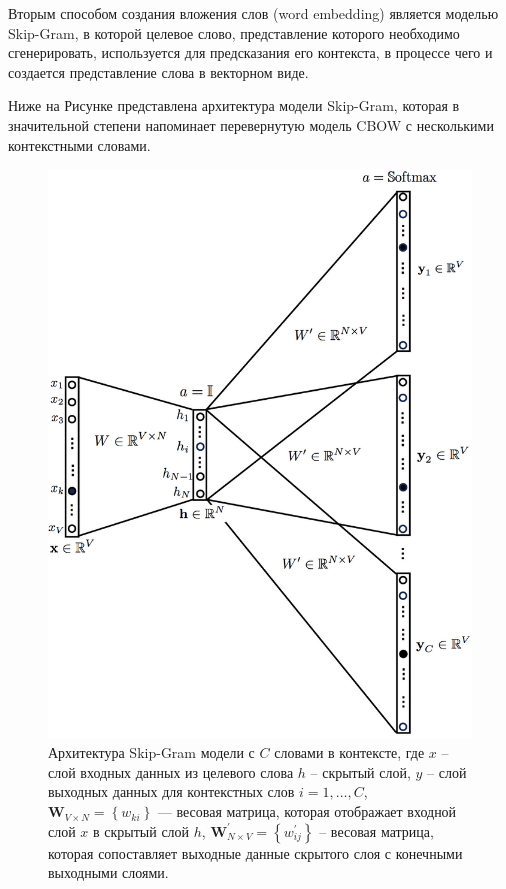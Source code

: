 \documentclass[12pt,a4paper, oneside]{extreport}
\begin{document}
Вторым способом создания вложения слов (word embedding) является моделью Skip-Gram, в которой целевое слово,  представление которого необходимо  сгенерировать, используется  для предсказания его контекста, в процессе чего и создается представление слова в векторном виде. 

Ниже на Рисунке представлена архитектура модели Skip-Gram, которая в значительной степени напоминает перевернутую модель CBOW с несколькими контекстными словами.


\begin{figure}
	\centering
	\includegraphics[width=0.7\linewidth]{screenshot004}
	\caption{Архитектура Skip-Gram модели  с  $C$ словами в контексте, где
	\newline		 $x$ -- слой входных данных из  целевого слова
	\newline		 $h $ -- скрытый слой,
	\newline		 $y
$ --  слой выходных данных для 	контекстных слов $i=1,\dots,C$, 	
	\newline
	$\mathbf{W}_{V \times N}=\left\{w_{k i}\right\}$ — весовая матрица, которая отображает входной слой $x$ в скрытый слой $h$,
	\newline
	$\mathbf{W}_{N \times V}^{\prime}=\left\{w_{i j}^{\prime}\right\}$ -- 
	весовая матрица, которая сопоставляет выходные данные скрытого слоя с конечными  выходными  слоями.}
	\label{fig:screenshot004}
\end{figure}
\end{document}
